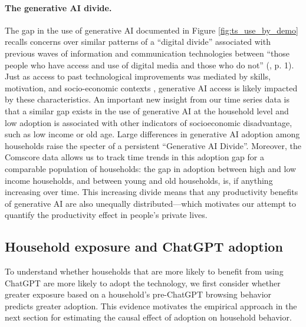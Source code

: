 \documentclass[12pt]{article}
\begin{document}
\paragraph*{The generative AI divide.} The gap in the use of generative AI documented in Figure \ref{fig:ts_use_by_demo}  recalls concerns over similar patterns of a ``digital divide'' associated with previous waves of information and communication technologies between ``those people who have access and use of digital media and those who do not'' (\cite{van2020digital}, p. 1). Just as access to past technological improvements was mediated by skills, motivation, and socio-economic contexts \citep{van2020digital}, generative AI access is likely impacted by these characteristics. An important new insight from our time series data is that a similar gap exists in the use of generative AI at the household level and low adoption is associated with other indicators of socioeconomic disadvantage, such as low income or old age. Large differences in generative AI adoption among households raise the specter of a persistent ``Generative AI Divide''. Moreover, the Comscore data allows us to track time trends in this adoption gap for a comparable population of households: the gap in adoption between high and low income households, and between young and old households, is, if anything increasing over time. This increasing divide means that any productivity benefits of generative AI are also unequally distributed---which motivates our attempt to quantify the productivity effect in people's private lives.



\subsection{Household exposure and ChatGPT adoption}

To understand whether households that are more likely to benefit from using ChatGPT are more likely to adopt the technology, we first consider whether greater exposure based on a household's pre-ChatGPT browsing behavior predicts greater adoption. This evidence motivates the empirical approach in the next section for estimating the causal effect of adoption on household behavior.
\end{document}

